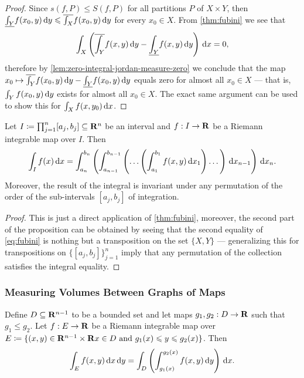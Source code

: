 \begin{proof}
    Since \(s(f, P) \leq S(f, P)\) for all partitions \(P\) of \(X \times Y\), then
    \(\underline{\int_Y} f(x_0, y)\, \mathrm{d} y \leqslant \overline{\int_X} f(x_0, y)\,
    \mathrm{d} y\) for every \(x_0 \in X\). From \cref{thm:fubini} we see that
    \[
        \int_X \left( \overline{\int_Y} f(x, y)\, \mathrm{d} y
        - \underline{\int_Y} f(x, y)\, \mathrm{d} y\right)\, \mathrm{d} x = 0,
    \]
    therefore by \cref{lem:zero-integral-jordan-measure-zero} we conclude that the
    map \(x_0 \mapsto \overline{\int_Y} f(x_0, y)\, \mathrm{d} y - \underline{\int_Y}
    f(x_0, y)\, \mathrm{d} y\) equals zero for almost all \(x_0 \in X\) --- that is,
    \(\int_Y f(x_0, y)\, \mathrm{d} y\) exists for almost all \(x_0 \in X\). The exact
    same argument can be used to show this for \(\int_X f(x, y_0)\, \mathrm{d} x\).
\end{proof}

\begin{corollary}
    \label{cor:iterated-fubini-theorem}
    Let \(I \coloneq \prod_{j = 1}^n [a_j, b_j] \subseteq \mathbf{R}^n\) be an interval and
    \(f: I \to \mathbf{R}\) be a Riemann integrable map over \(I\). Then
    \[
        \int_I f(x)\, \mathrm{d} x = \int_{a_n}^{b_n} \left(
        \int_{a_{n-1}}^{b_{n-1}} \left(
        \dots \left(
        \int_{a_1}^{b_1} f(x, y)\, \mathrm{d} x_1
        \right)
        \dots \right)\, \mathrm{d} x_{n-1} \right)\, \mathrm{d} x_n.
    \]
    Moreover, the result of the integral is invariant under any permutation of the
    order of the sub-intervals \([a_j, b_j]\) of integration.
\end{corollary}

\begin{proof}
    This is just a direct application of \cref{thm:fubini}, moreover, the second
    part of the proposition can be obtained by seeing that the second equality of
    \cref{eq:fubini} is nothing but a transposition on the set \(\{X, Y\}\) ---
    generalizing this for transpositions on \(\{[a_j, b_j]\}_{j=1}^n\) imply that
    any permutation of the collection satisfies the integral equality.
\end{proof}

\subsubsection{Measuring Volumes Between Graphs of Maps}

\begin{corollary}
    \label{cor:integral-over-graph-maps}
    Define \(D \subseteq \mathbf{R}^{n-1}\) to be a bounded set and let maps \(g_{1}, g_{2}:
    D \to \mathbf{R}\) such that \(g_1 \leq g_2\). Let \(f: E \to \mathbf{R}\) be a Riemann
    integrable map over \(E \coloneq \{(x, y) \in \mathbf{R}^{n - 1} \times \mathbf{R} \relax x \in D
    \text{ and } g_1(x) \leqslant y \leqslant g_2(x)\}\). Then
    \[
        \int_E f(x, y)\, \mathrm{d} x\, \mathrm{d} y
        = \int_D \left( \int_{g_1(x)}^{g_2(x)} f(x, y)\, \mathrm{d} y \right)\, \mathrm{d} x.
    \]
\end{corollary}

